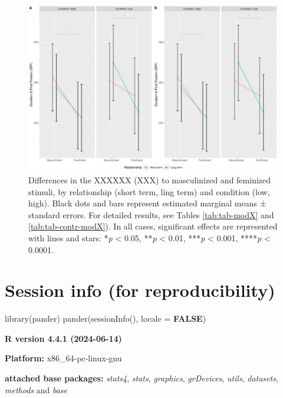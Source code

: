 \documentclass[
  bookmarksnumbered]{article}
\newenvironment{Shaded}{\begin{snugshade}}{\end{snugshade}}
\newcommand{\AttributeTok}[1]{\textcolor[rgb]{0.80,0.80,0.80}{#1}}
\newcommand{\ConstantTok}[1]{\textcolor[rgb]{0.86,0.64,0.64}{\textbf{#1}}}
\newcommand{\FunctionTok}[1]{\textcolor[rgb]{0.94,0.94,0.56}{#1}}
\newcommand{\NormalTok}[1]{\textcolor[rgb]{0.80,0.80,0.80}{#1}}
\begin{document}
\begin{figure}
\centering
\includegraphics{Supplementary_material_files/figure-latex/unnamed-chunk-35-1.pdf}
\caption{\label{fig:unnamed-chunk-35}Differences in the XXXXXX (XXX) to masculinized and feminized stimuli, by relationship (short term, ling term) and condition (low, high). Black dots and bars represent estimated marginal means ± standard errors. For detailed results, see Tables \ref{tab:tab-modX} and \ref{tab:tab-contr-modX}). In all cases, significant effects are represented with lines and stars: *\emph{p} \textless{} 0.05, **\emph{p} \textless{} 0.01, ***\emph{p} \textless{} 0.001, ****\emph{p} \textless{} 0.0001.}
\end{figure}

\section{Session info (for reproducibility)}\label{session}

\begin{Shaded}
\begin{Highlighting}[]
\FunctionTok{library}\NormalTok{(pander)}
\FunctionTok{pander}\NormalTok{(}\FunctionTok{sessionInfo}\NormalTok{(), }\AttributeTok{locale =} \ConstantTok{FALSE}\NormalTok{)}
\end{Highlighting}
\end{Shaded}

\textbf{R version 4.4.1 (2024-06-14)}

\textbf{Platform:} x86\_64-pc-linux-gnu

\textbf{attached base packages:}
\emph{stats4}, \emph{stats}, \emph{graphics}, \emph{grDevices}, \emph{utils}, \emph{datasets}, \emph{methods} and \emph{base}
\end{document}
